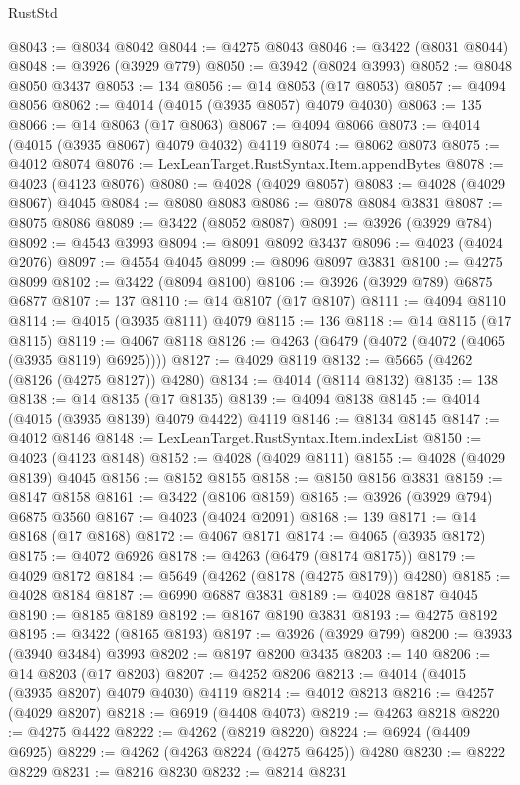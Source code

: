 \begin{lexlean}{RustStd}
\begin{coremodule}
@8043 := @8034 @8042
@8044 := @4275 @8043
@8046 := @3422 (@8031 @8044)
@8048 := @3926 (@3929 @779)
@8050 := @3942 (@8024 @3993)
@8052 := @8048 @8050 @3437
@8053 := 134
@8056 := @14 @8053 (@17 @8053)
@8057 := @4094 @8056
@8062 := @4014 (@4015 (@3935 @8057) @4079 @4030)
@8063 := 135
@8066 := @14 @8063 (@17 @8063)
@8067 := @4094 @8066
@8073 := @4014 (@4015 (@3935 @8067) @4079 @4032) @4119
@8074 := @8062 @8073
@8075 := @4012 @8074
@8076 := LexLeanTarget.RustSyntax.Item.appendBytes
@8078 := @4023 (@4123 @8076)
@8080 := @4028 (@4029 @8057)
@8083 := @4028 (@4029 @8067) @4045
@8084 := @8080 @8083
@8086 := @8078 @8084 @3831
@8087 := @8075 @8086
@8089 := @3422 (@8052 @8087)
@8091 := @3926 (@3929 @784)
@8092 := @4543 @3993
@8094 := @8091 @8092 @3437
@8096 := @4023 (@4024 @2076)
@8097 := @4554 @4045
@8099 := @8096 @8097 @3831
@8100 := @4275 @8099
@8102 := @3422 (@8094 @8100)
@8106 := @3926 (@3929 @789) @6875 @6877
@8107 := 137
@8110 := @14 @8107 (@17 @8107)
@8111 := @4094 @8110
@8114 := @4015 (@3935 @8111) @4079
@8115 := 136
@8118 := @14 @8115 (@17 @8115)
@8119 := @4067 @8118
@8126 := @4263 (@6479 (@4072 (@4072 (@4065 (@3935 @8119) @6925))))
@8127 := @4029 @8119
@8132 := @5665 (@4262 (@8126 (@4275 @8127)) @4280)
@8134 := @4014 (@8114 @8132)
@8135 := 138
@8138 := @14 @8135 (@17 @8135)
@8139 := @4094 @8138
@8145 := @4014 (@4015 (@3935 @8139) @4079 @4422) @4119
@8146 := @8134 @8145
@8147 := @4012 @8146
@8148 := LexLeanTarget.RustSyntax.Item.indexList
@8150 := @4023 (@4123 @8148)
@8152 := @4028 (@4029 @8111)
@8155 := @4028 (@4029 @8139) @4045
@8156 := @8152 @8155
@8158 := @8150 @8156 @3831
@8159 := @8147 @8158
@8161 := @3422 (@8106 @8159)
@8165 := @3926 (@3929 @794) @6875 @3560
@8167 := @4023 (@4024 @2091)
@8168 := 139
@8171 := @14 @8168 (@17 @8168)
@8172 := @4067 @8171
@8174 := @4065 (@3935 @8172)
@8175 := @4072 @6926
@8178 := @4263 (@6479 (@8174 @8175))
@8179 := @4029 @8172
@8184 := @5649 (@4262 (@8178 (@4275 @8179)) @4280)
@8185 := @4028 @8184
@8187 := @6990 @6887 @3831
@8189 := @4028 @8187 @4045
@8190 := @8185 @8189
@8192 := @8167 @8190 @3831
@8193 := @4275 @8192
@8195 := @3422 (@8165 @8193)
@8197 := @3926 (@3929 @799)
@8200 := @3933 (@3940 @3484) @3993
@8202 := @8197 @8200 @3435
@8203 := 140
@8206 := @14 @8203 (@17 @8203)
@8207 := @4252 @8206
@8213 := @4014 (@4015 (@3935 @8207) @4079 @4030) @4119
@8214 := @4012 @8213
@8216 := @4257 (@4029 @8207)
@8218 := @6919 (@4408 @4073)
@8219 := @4263 @8218
@8220 := @4275 @4422
@8222 := @4262 (@8219 @8220)
@8224 := @6924 (@4409 @6925)
@8229 := @4262 (@4263 @8224 (@4275 @6425)) @4280
@8230 := @8222 @8229
@8231 := @8216 @8230
@8232 := @8214 @8231

\end{coremodule}
\end{lexlean}
